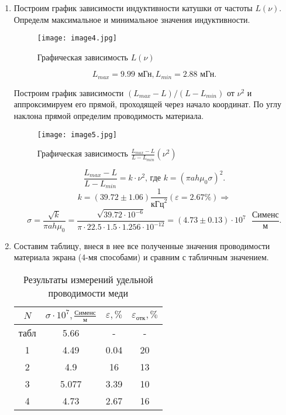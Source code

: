 \documentclass[a4paper,12pt]{article} %
\begin{document}
\begin{enumerate}
    \item Построим график зависимости индуктивности катушки от частоты $L(\nu)$. Определм максимальное и минимальное значения индуктивности.

    \begin{figure}[!h]
        \centering
        \texttt{[image: image4.jpg]}
        \caption{Графическая зависимость $L(\nu)$}
        \label{graf1}
    \end{figure}

    \[ L_{max} = 9.99 \text{ мГн},  L_{min} = 2.88 \text{ мГн.}\]

    Построим график зависимости $(L_{max} - L)/(L - L_{min})$ от $\nu^2$ и аппроксимируем его прямой, проходящей через начало координат. По углу наклона прямой определим проводимость материала.

    \begin{figure}[!h]
        \centering
        \texttt{[image: image5.jpg]}
        \caption{Графическая зависимость $\frac{L_{max} - L}{L - L_{min}}(\nu^2)$}
        \label{graf1}
    \end{figure}

    \[ \frac{L_{max} - L}{L - L_{min}} = k\cdot\nu^2 \text{, где } k = (\pi ah\mu_0\sigma)^2. \]
    \[ k = (39.72 \pm 1.06) \frac{1}{\text{кГц}^2} (\varepsilon = 2.67 \%) \Longrightarrow \] \[ \sigma = \frac{\sqrt{k}}{\pi ah\mu_0} = \frac{\sqrt{39.72 \cdot 10^{-6}}}{\pi \cdot 22.5 \cdot 1.5 \cdot 1.256 \cdot 10^{-12}} = (4.73 \pm 0.13) \cdot 10^{7}\text{ }\frac{\text{Сименс}}{\text{м}}. \]

    \item Составим таблицу, внеся в нее все полученные значения проводимости материала экрана (4-мя способами) и сравним с табличным значением.

    \begin{table}[h]
        \centering
        \begin{tabular}{|c|c|c|c|}
			\hline
                $N$ & $\sigma \cdot 10^7, \frac{\text{Сименс}}{\text{м}}$ &  $\varepsilon, \%$ & $\varepsilon_{\text{отк}}, \%$ \\ \hline
                табл & 5.66 & - & - \\ \hline
                1 & 4.49 & 0.04 & 20 \\ \hline
                2 & 4.9 & 16 & 13 \\ \hline
                3 & 5.077 & 3.39 & 10 \\ \hline
                4 & 4.73 & 2.67 & 16 \\ \hline
		\end{tabular}
        \caption{Результаты измерений удельной проводимости меди}
        \label{tab5}
    \end{table}


\end{enumerate}
\end{document}
